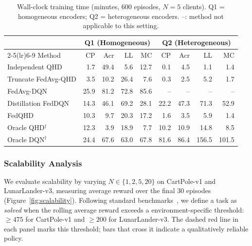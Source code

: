 \begin{table}[t]
  \centering
  \caption{%
    Wall-clock training time (minutes, 600 episodes, $N{=}5$ clients).
    Q1 = homogeneous encoders; Q2 = heterogeneous encoders.
    {--}: method not applicable to this setting.
  }
  \label{tab:computation_cost}
  \setlength{\tabcolsep}{4pt}
  \begin{tabular}{l rrrr rrrr}
  \toprule
   & \multicolumn{4}{c}{Q1 (Homogeneous)}
   & \multicolumn{4}{c}{Q2 (Heterogeneous)} \\
  \cmidrule(lr){2-5}\cmidrule(lr){6-9}
  Method & CP & Acr & LL & MC & CP & Acr & LL & MC \\
  \midrule
  Independent QHD
    & 1.7 & 49.4 & 5.6 & 12.7 & 0.1 & 4.5 & 1.1 & 1.4 \\
  Truncate FedAvg-QHD
    & 3.5 & 10.2 & 26.4 & 7.6 & 0.3 & 2.5 & 5.2 & 1.7 \\
  FedAvg-DQN
    & 25.9 & 81.2 & 72.8 & 85.6 & {--} & {--} & {--} & {--} \\
  Distillation FedDQN
    & 14.3 & 46.1 & 69.2 & 28.1 & 22.2 & 47.3 & 71.3 & 52.9 \\
  FedQHD
    & 10.3 & 9.7 & 20.3 & 17.2 & 1.6 & 3.5 & 5.9 & 1.4 \\
  \midrule
  Oracle QHD$^\dagger$
    & 12.3 & 3.9 & 18.9 & 7.7 & 10.2 & 10.9 & 14.8 & 8.5 \\
  Oracle DQN$^\dagger$
    & 24.4 & 67.6 & 63.0 & 67.8 & 81.6 & 86.4 & 156.5 & 101.5 \\
  \bottomrule
  \end{tabular}
  \end{table}



\subsubsection{Scalability Analysis}
\label{subsec:scalability}

We evaluate scalability by varying $N \in \{1, 2, 5, 20\}$ on CartPole-v1 and LunarLander-v3, measuring average reward over the final 30 episodes (Figure~\ref{fig:scalability}).
Following standard benchmarks~\cite{brockman2016openai}, we define a task as \emph{solved} when the rolling average reward exceeds a environment-specific threshold: $\geq\!475$ for CartPole-v1 and $\geq\!200$ for LunarLander-v3.
The dashed red line in each panel marks this threshold; bars that cross it indicate a qualitatively reliable policy.

